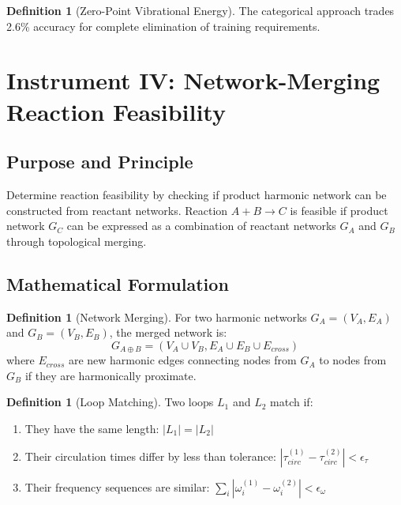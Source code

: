 \documentclass[11pt,a4paper]{article}
\theoremstyle{definition}
\newtheorem{definition}[theorem]{Definition}
\theoremstyle{remark}
\begin{document}
\begin{definition}[Zero-Point Vibrational Energy]
The categorical approach trades 2.6\% accuracy for complete elimination of training requirements.

\section{Instrument IV: Network-Merging Reaction Feasibility}
\label{sec:instrument4}

\subsection{Purpose and Principle}

Determine reaction feasibility by checking if product harmonic network can be constructed from reactant networks. Reaction $A + B \to C$ is feasible if product network $G_C$ can be expressed as a combination of reactant networks $G_A$ and $G_B$ through topological merging.

\subsection{Mathematical Formulation}

\begin{definition}[Network Merging]
\label{def:network_merging}
For two harmonic networks $G_A = (V_A, E_A)$ and $G_B = (V_B, E_B)$, the merged network is:
\begin{equation}
G_{A \oplus B} = (V_A \cup V_B, E_A \cup E_B \cup E_{cross})
\end{equation}
where $E_{cross}$ are new harmonic edges connecting nodes from $G_A$ to nodes from $G_B$ if they are harmonically proximate.
\end{definition}

\begin{definition}[Loop Matching]
\label{def:loop_matching}
Two loops $L_1$ and $L_2$ match if:
\begin{enumerate}
\item They have the same length: $|L_1| = |L_2|$
\item Their circulation times differ by less than tolerance: $|\tau_{circ}^{(1)} - \tau_{circ}^{(2)}| < \epsilon_\tau$
\item Their frequency sequences are similar: $\sum_i |\omega_i^{(1)} - \omega_i^{(2)}| < \epsilon_\omega$
\end{enumerate}
\end{definition}


\end{definition}
\end{document}
